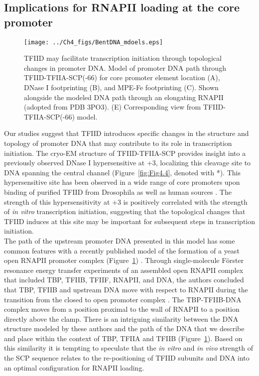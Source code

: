 \subsection{Implications for RNAPII loading at the core promoter}

\begin{figure}
\centering
\texttt{[image: ../Ch4\_figs/BentDNA\_mdoels.eps]}
\caption[TFIID may facilitate transcription initiation through topological changes in promoter DNA]{TFIID may facilitate transcription initiation through topological changes in promoter DNA. Model of promoter DNA path through TFIID-TFIIA-SCP(-66) for core promoter element location (A), DNase I footprinting (B), and MPE-Fe footprinting (C). Shown alongside the modeled DNA path through an elongating RNAPII (adopted from PDB 3PO3). (E) Corresponding view from TFIID-TFIIA-SCP(-66) model.}
\label{fig:BentDNA}
\end{figure}

Our studies suggest that TFIID introduces specific changes in the structure and topology of promoter DNA that may contribute to its role in transcription initiation.  The cryo-EM structure of TFIID-TFIIA-SCP provides insight into a previously observed DNase I hypersensitive at +3, localizing this cleavage site to DNA spanning the central channel (Figure~\ref{fig:Fig4.4}, denoted with *).  This hypersensitive site has been observed in a wide range of core promoters upon binding of purified TFIID from Drosophila \cite{Burke_3081,Kutach_2124,Lim_1522,Parry_382,Purnell_3259,Theisen_341} as well as human sources \cite{Chi_3023,Juven-Gershon_1249,Kaufmann_3320,Lieberman_2671,Oelgeschlager_2880}.  The strength of this hypersensitivity at +3 is positively correlated with the strength of \emph{in vitro} transcription initiation, suggesting that the topological changes that TFIID induces at this site may be important for subsequent steps in transcription initiation.  \\
\indent The path of the upstream promoter DNA presented in this model has some common features with a recently published model of the formation of a yeast open RNAPII promoter complex (Figure~\ref{fig:BentDNA}) \cite{Treutlein_2}.  Through single-molecule F\"{o}rster resonance energy transfer experiments of an assembled open RNAPII complex that included TBP, TFIIB, TFIIF, RNAPII, and DNA, the authors concluded that TBP, TFIIB and upstream DNA move with respect to RNAPII during the transition from the closed to open promoter complex \cite{Treutlein_2}.  The TBP-TFIIB-DNA complex moves from a position proximal to the wall of RNAPII to a position directly above the clamp. There is an intriguing similarity between the DNA structure modeled by these authors \cite{Treutlein_2} and the path of the DNA that we describe and place within the context of TBP, TFIIA and TFIIB (Figure~\ref{fig:BentDNA}). Based on this similarity it is tempting to speculate that the \emph{in vitro} and \emph{in vivo} strength of the SCP sequence relates to the re-positioning of TFIID subunits and DNA into an optimal configuration for RNAPII loading.
